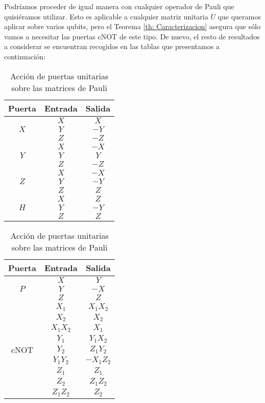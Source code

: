 \documentclass[11pt,a4paper,twoside,pdf]{article}
\numberwithin{equation}{section}
\begin{document}
		Podríamos proceder de igual manera con cualquier operador de Pauli que quisiéramos utilizar. Esto es aplicable a cualquier matriz unitaria $U$ que queramos aplicar sobre varios qubits, pero el Teorema \ref{th: Caracterizacion} asegura que sólo vamos a necesitar las puertas cNOT de este tipo. De nuevo, el resto de resultados a considerar se encuentran recogidos en las tablas que presentamos a continuación:
			
			\begin{table}[h]
				\centering
					\begin{tabular}{| c | c | c | }
						\hline
							Puerta & Entrada & Salida \\ 						\hline
							\multirow{3}{*}{$X$}	& $X$ & $X$ \\
																& $Y$ & $-Y$ \\
																& $Z$ & $-Z$  \\	\hline
							\multirow{3}{*}{$Y$}	& $X$ & $-X$ \\
																& $Y$ & $Y$	\\
																& $Z$ & $-Z$ \\		\hline
							\multirow{3}{*}{$Z$}	& $X$ & $-X$ \\
																& $Y$ & $-Y$ \\
																& $Z$ & $Z$ \\		\hline	
							\multirow{3}{*}{$H$}	& $X$ & $Z$ \\
																& $Y$ & $-Y$ \\
																& $Z$ & $Z$ \\ 		\hline												
					\end{tabular}		
				\qquad
					\begin{tabular}{| c | c | c | }
						\hline
							Puerta & Entrada & Salida \\ 						\hline
							\multirow{3}{*}{$P$}	& $X$ & $Y$ \\
																& $Y$ & $-X$ \\
																& $Z$ & $Z$  \\	\hline
							\multirow{9}{*}{cNOT} 	 & $X_1$ & $X_1X_2$ \\ 
																	& $X_2$ & $X_2$ \\ 
																	& $X_1X_2$ & $X_1$ \\ \cline{2-3} 
																	& $Y_1$ & $Y_1X_2$ \\  
																	& $Y_2$ & $Z_1Y_2$ \\ 
																	& $Y_1Y_2$ & $-X_1Z_2$ \\ \cline{2-3} 
																	& $Z_1$ & $Z_1$ \\ 
																	& $Z_2$ & $Z_1Z_2$ \\ 
																	& $Z_1Z_2$ & $Z_2$ \\ \hline																						
					\end{tabular}	
				\caption{Acción de puertas unitarias sobre las matrices de Pauli}
				\label{tab: Estabilizadores Pauli}
			\end{table}		
	
\end{document}
